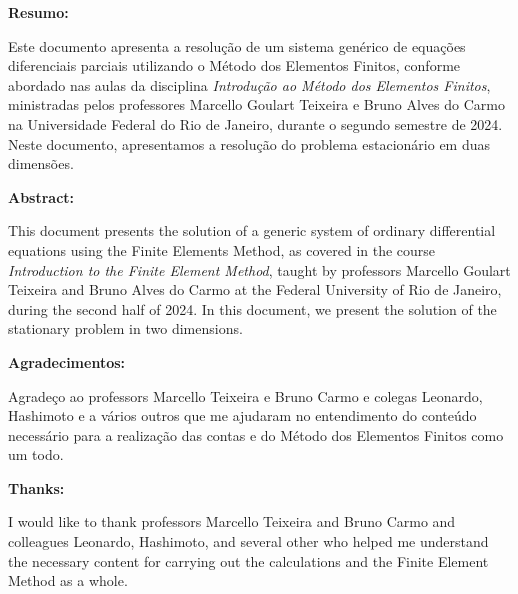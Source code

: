 \maketitle
\newpage

\begin{center}
  \textbf{Resumo:}
\end{center}

  Este documento apresenta a resolução de um sistema genérico de equações diferenciais parciais utilizando o Método dos Elementos Finitos, conforme abordado nas aulas da disciplina \textit{Introdução ao Método dos Elementos Finitos}, ministradas pelos professores Marcello Goulart Teixeira e Bruno Alves do Carmo na Universidade Federal do Rio de Janeiro, durante o segundo semestre de 2024. Neste documento, apresentamos a resolução do problema estacionário em duas dimensões.

\vspace{0.3cm}

\begin{center}
  \textbf{Abstract:}
\end{center}

  This document presents the solution of a generic system of ordinary differential equations using the Finite Elements Method, as covered in the course \textit{Introduction to the Finite Element Method}, taught by professors Marcello Goulart Teixeira and Bruno Alves do Carmo at the Federal University of Rio de Janeiro, during the second half of 2024. In this document, we present the solution of the stationary problem in two dimensions.

\vspace{0.3cm}

\begin{center}
  \textbf{Agradecimentos:}
\end{center}

  Agradeço ao professors Marcello Teixeira e Bruno Carmo e colegas Leonardo, Hashimoto e a vários outros que me ajudaram no entendimento do conteúdo necessário para a realização das contas e do Método dos Elementos Finitos como um todo.

\vspace{0.3cm}

\begin{center}
  \textbf{Thanks:}
\end{center}

  I would like to thank professors Marcello Teixeira and Bruno Carmo and colleagues Leonardo, Hashimoto, and several other who helped me understand the necessary content for carrying out the calculations and the Finite Element Method as a whole.

\newpage
\tableofcontents
\newpage
